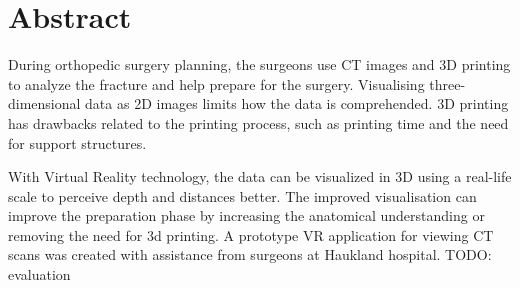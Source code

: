 \documentclass[a4paper]{report}
\begin{document}
%
%


\makeatletter
{}
\def\lst@SkipToFirst{%
    \lst@ifmatchrangestart\c@lstnumber=\numexpr-1+\lst@firstline\fi
    \ifnum \lst@lineno<\lst@firstline
        \def\lst@next{\lst@BeginDropInput\lst@Pmode
        \lst@Let{13}\lst@MSkipToFirst
        \lst@Let{10}\lst@MSkipToFirst}%
        \expandafter\lst@next
    \else
        \expandafter\lst@BOLGobble
    \fi}
\makeatother



\titlePage
\pagebreak

\section*{Abstract}
During orthopedic surgery planning, the surgeons use CT images and 3D printing to analyze the fracture and help prepare for the surgery.
Visualising three-dimensional data as 2D images limits how the data is comprehended. 3D printing has drawbacks related to the printing process, such as printing time and the need for support structures.

With Virtual Reality technology, the data can be visualized in 3D using a real-life scale to perceive depth and distances better. The improved visualisation can improve the preparation phase by increasing the anatomical understanding or removing the need for 3d printing.
A prototype VR application for viewing CT scans was created with assistance from surgeons at Haukland hospital.
TODO: evaluation
\end{document}
